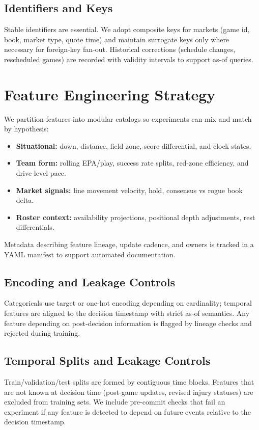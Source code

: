 \subsection{Identifiers and Keys}
Stable identifiers are essential. We adopt composite keys for markets (game id, book, market type, quote time) and maintain surrogate keys only where necessary for foreign-key fan-out. Historical corrections (schedule changes, rescheduled games) are recorded with validity intervals to support as-of queries.

\section{Feature Engineering Strategy}
We partition features into modular catalogs so experiments can mix and match by hypothesis:
\begin{itemize}
  \item \textbf{Situational:} down, distance, field zone, score differential, and clock states.
  \item \textbf{Team form:} rolling EPA/play, success rate splits, red-zone efficiency, and drive-level pace.
  \item \textbf{Market signals:} line movement velocity, hold, consensus vs rogue book delta.
  \item \textbf{Roster context:} availability projections, positional depth adjustments, rest differentials.
\end{itemize}
Metadata describing feature lineage, update cadence, and owners is tracked in a YAML manifest to support automated documentation.

\subsection{Encoding and Leakage Controls}
Categoricals use target or one-hot encoding depending on cardinality; temporal features are aligned to the decision timestamp with strict as‑of semantics. Any feature depending on post‑decision information is flagged by lineage checks and rejected during training.

\subsection{Temporal Splits and Leakage Controls}
Train/validation/test splits are formed by contiguous time blocks. Features that are not known at decision time (post-game updates, revised injury statuses) are excluded from training sets. We include pre-commit checks that fail an experiment if any feature is detected to depend on future events relative to the decision timestamp.

